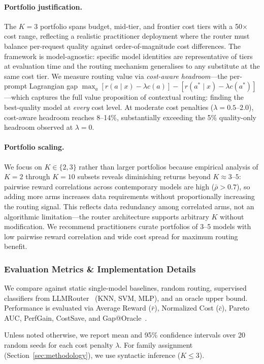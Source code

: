 \paragraph{Portfolio justification.}
The $K{=}3$ portfolio spans budget, mid-tier, and frontier cost tiers with a 50$\times$ cost range, reflecting a realistic practitioner deployment where the router must balance per-request quality against order-of-magnitude cost differences.
The framework is model-agnostic: specific model identities are representative of tiers at evaluation time and the routing mechanism generalises to any substitute at the same cost tier.
We measure routing value via \emph{cost-aware headroom}---the per-prompt Lagrangian gap $\max_a [r(a \mid x) - \lambda c(a)] - [r(a^* \mid x) - \lambda c(a^*)]$---which captures the full value proposition of contextual routing: finding the best-quality model at \emph{every} cost level.
At moderate cost penalties ($\lambda{=}0.5$--$2.0$), cost-aware headroom reaches 8--14\%, substantially exceeding the 5\% quality-only headroom observed at $\lambda{=}0$.

\paragraph{Portfolio scaling.}
We focus on $K{\in}\{2,3\}$ rather than larger portfolios because empirical analysis of $K{=}2$ through $K{=}10$ subsets reveals diminishing returns beyond $K{\approx}3$--$5$: pairwise reward correlations across contemporary models are high ($\bar{\rho}{>}0.7$), so adding more arms increases data requirements without proportionally increasing the routing signal.
This reflects data redundancy among correlated arms, not an algorithmic limitation---the router architecture supports arbitrary $K$ without modification.
We recommend practitioners curate portfolios of 3--5 models with low pairwise reward correlation and wide cost spread for maximum routing benefit.

\subsubsection{Evaluation Metrics \& Implementation Details}

We compare against static single-model baselines, random routing, supervised classifiers from LLMRouter~\cite{ding2024hybrid} (KNN, SVM, MLP), and an oracle upper bound. Performance is evaluated via Average Reward ($\bar{r}$), Normalized Cost ($\bar{c}$), Pareto AUC, PerfGain, CostSave, and Gap@Oracle~\cite{hu2024routerbench}.

Unless noted otherwise, we report mean and 95\% confidence intervals over 20 random seeds for each cost penalty $\lambda$. For family assignment (Section~\ref{sec:methodology}), we use syntactic inference ($K{\leq}3$).